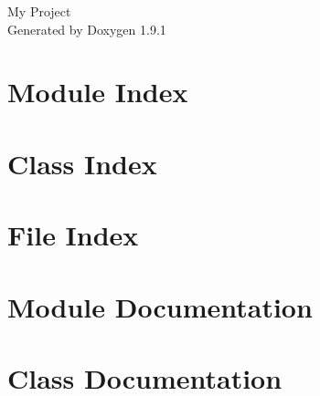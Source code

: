\let\mypdfximage\pdfximage\def\pdfximage{\immediate\mypdfximage}\documentclass[twoside]{book}
\newcommand{\+}{\discretionary{\mbox{\scriptsize$\hookleftarrow$}}{}{}}
\newcommand{\clearemptydoublepage}{%
  \newpage{\pagestyle{empty}\cleardoublepage}%
}
\begin{document}
\raggedbottom

\hypersetup{pageanchor=false,
             bookmarksnumbered=true,
             pdfencoding=unicode
            }
\begin{titlepage}
\vspace*{7cm}
\begin{center}%
{\Large My Project }\\
\vspace*{1cm}
{\large Generated by Doxygen 1.9.1}\\
\end{center}
\end{titlepage}
\clearemptydoublepage
{}
\tableofcontents
\clearemptydoublepage
{}
\hypersetup{pageanchor=true}

\chapter{Module Index}

\chapter{Class Index}

\chapter{File Index}

\chapter{Module Documentation}


\chapter{Class Documentation}
















\end{document}
